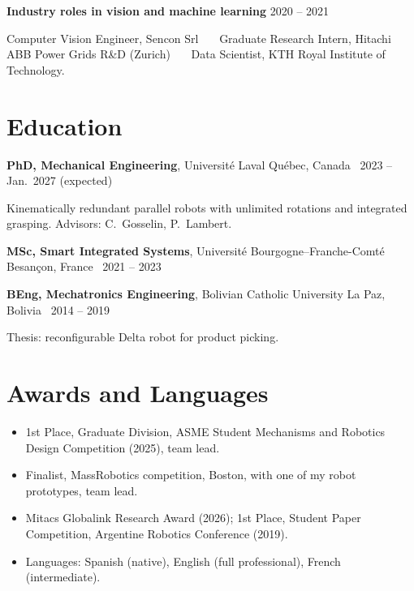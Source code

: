 \documentclass[10pt,letterpaper]{article}
\begin{document}
\vspace{3pt}
\textbf{Industry roles in vision and machine learning} \hfill {\color{muted}2020 -- 2021}\par
{\small Computer Vision Engineer, Sencon Srl \ \textbullet\ \ Graduate Research Intern, Hitachi ABB Power Grids R\&D (Zurich)
\ \textbullet\ \ Data Scientist, KTH Royal Institute of Technology.}

\section{Education}
\textbf{PhD, Mechanical Engineering}, Universit\'e Laval \hfill {\color{muted}Qu\'ebec, Canada \textbar\ 2023 -- Jan.\ 2027 (expected)}\par
{\small Kinematically redundant parallel robots with unlimited rotations and integrated grasping. Advisors: C.~Gosselin, P.~Lambert.}\par\vspace{2pt}
\textbf{MSc, Smart Integrated Systems}, Universit\'e Bourgogne--Franche-Comt\'e \hfill {\color{muted}Besan\c{c}on, France \textbar\ 2021 -- 2023}\par\vspace{2pt}
\textbf{BEng, Mechatronics Engineering}, Bolivian Catholic University \hfill {\color{muted}La Paz, Bolivia \textbar\ 2014 -- 2019}\par
{\small Thesis: reconfigurable Delta robot for product picking.}

\section{Awards and Languages}
\begin{itemize}
\item 1st Place, Graduate Division, ASME Student Mechanisms and Robotics Design Competition (2025), team lead.
\item Finalist, MassRobotics competition, Boston, with one of my robot prototypes, team lead.
\item Mitacs Globalink Research Award (2026); 1st Place, Student Paper Competition, Argentine Robotics Conference (2019).
\item Languages: Spanish (native), English (full professional), French (intermediate).
\end{itemize}

\newpage
\end{document}
